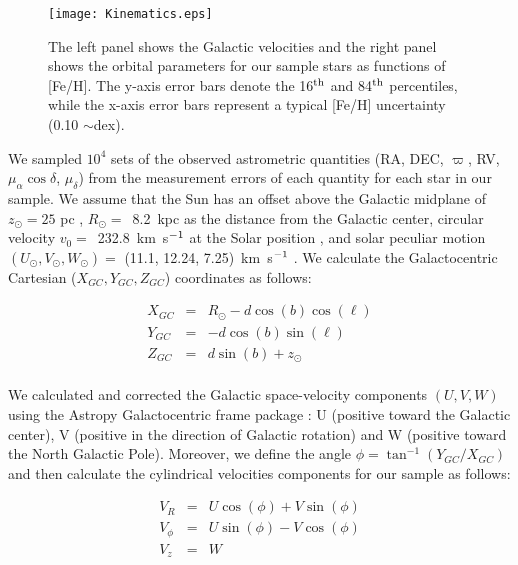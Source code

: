 \begin{figure}[!ht]
\centering
\texttt{[image: Kinematics.eps]} 
\caption{The left panel shows the Galactic velocities and the right panel shows
the orbital parameters for our sample stars as functions of [Fe/H]. The
y-axis error bars denote the 16$^{\rm th}$ and 84$^{\rm th}$ percentiles, while
the x-axis error bars represent a typical [Fe/H] uncertainty (0.10
$\sim$dex).}
\label{fig:Kinematics}
\end{figure}

We sampled $10^{4}$ sets of the observed astrometric quantities (RA, DEC,
$\varpi$, RV, $\mu_{\alpha}\cos\delta$, $\mu_{\delta}$) from the measurement
errors of each quantity for each star in our sample. We assume that the Sun has an offset above the
Galactic midplane of $z_{\odot}= 25$ pc \citep{2008ApJ...673..864J}, $R_{\odot}
=$~8.2~kpc \citep{2016ARA&A..54..529B} as the distance from the Galactic center,
circular velocity $v_0 =$~232.8~\mbox{km~s$^{\rm -1}$} at the Solar position
\citep{ 2017MNRAS.465...76M}, and solar peculiar motion $(U_\odot, V_\odot,
W_\odot) =$ (11.1, 12.24, 7.25)~\mbox{km~s$^{\rm -1}$}
\citep{2016ARA&A..54..529B}.  We calculate the Galactocentric Cartesian
($X_{GC}, Y_{GC}, Z_{GC}$) coordinates as follows:

\begin{eqnarray*} \label{eq:xyz}
X_{GC}  & = & R_{\odot} - d \cos (b) \cos (\ell) \\
Y_{GC}  & = &- d \cos (b) \sin (\ell)  \\
Z_{GC}  & = & d \sin (b) + z_{\odot}\\
\end{eqnarray*}

We calculated and corrected the Galactic space-velocity components $(U, V, W)$
using the Astropy Galactocentric frame package \citep{2013A&A...558A..33A,
2018AJ....156..123A}: U (positive toward the Galactic center), V (positive in
the direction of Galactic rotation) and W (positive toward the North Galactic
Pole).  Moreover, we define the angle $\phi = \tan^{-1}(Y_{GC}/X_{GC})$ and then
calculate the cylindrical velocities components for our sample as follows:

 \begin{eqnarray*} \label{eq:xyz}
V_{R}    & = & U \cos (\phi) + V \sin (\phi)\\
V_{\phi} & = & U \sin (\phi) - V \cos (\phi) \\
V_{z}     & = & W \\
\end{eqnarray*}

